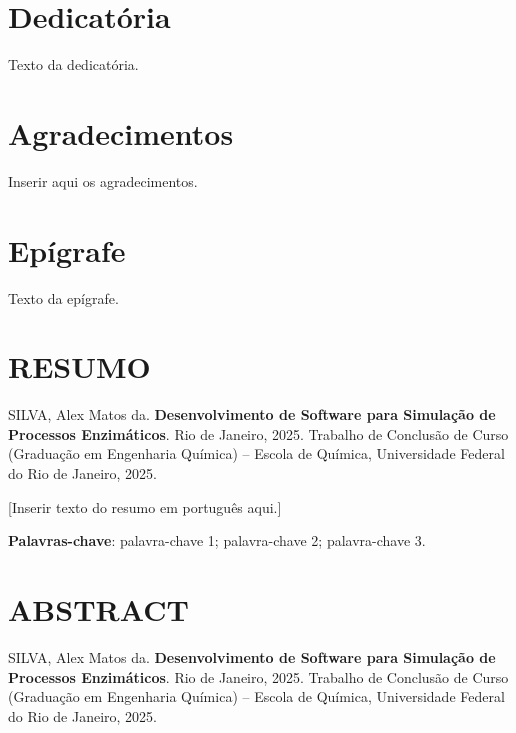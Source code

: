 \documentclass[12pt,oneside]{report}
\begin{document}
\chapter*{Dedicatória}
\vspace*{\fill}
\begin{center}
    Texto da dedicatória.
\end{center}
\vspace*{\fill}

\chapter*{Agradecimentos}
Inserir aqui os agradecimentos.

\chapter*{Epígrafe}
\vspace*{\fill}
\begin{flushright}
    Texto da epígrafe.
\end{flushright}
\vspace*{\fill}

\chapter*{\MakeUppercase{Resumo}}
SILVA, Alex Matos da. \textbf{Desenvolvimento de Software para Simulação de Processos Enzimáticos}. Rio de Janeiro, 2025. Trabalho de Conclusão de Curso (Graduação em Engenharia Química) – Escola de Química, Universidade Federal do Rio de Janeiro, 2025.

\medskip

[Inserir texto do resumo em português aqui.]

\medskip

\textbf{Palavras-chave}: palavra-chave 1; palavra-chave 2; palavra-chave 3.

\chapter*{\MakeUppercase{Abstract}}
SILVA, Alex Matos da. \textbf{Desenvolvimento de Software para Simulação de Processos Enzimáticos}. Rio de Janeiro, 2025. Trabalho de Conclusão de Curso (Graduação em Engenharia Química) – Escola de Química, Universidade Federal do Rio de Janeiro, 2025.

\medskip
\end{document}
